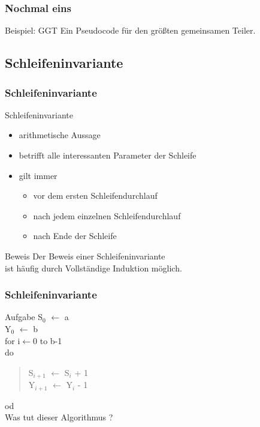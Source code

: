 \documentclass{beamer}
\begin{document}
\begin{frame}
	\frametitle{Nochmal eins}
	\begin{block}{Beispiel: GGT}
		Ein Pseudocode für den größten gemeinsamen Teiler.
	\end{block}
\end{frame}

\subsection{Schleifeninvariante}
\begin{frame}
	\frametitle{Schleifeninvariante}
	\begin{block}{Schleifeninvariante}
		\begin{itemize}
			\item arithmetische Aussage
			\item betrifft alle interessanten Parameter der Schleife
			\item gilt immer
			\begin{itemize}
				\item vor dem ersten Schleifendurchlauf
				\item nach jedem einzelnen Schleifendurchlauf
				\item nach Ende der Schleife
			\end{itemize}
		\end{itemize}
	\end{block}
	\begin{block}{Beweis}
		Der Beweis einer Schleifeninvariante \\
		ist häufig durch Vollständige Induktion möglich.
	\end{block}
\end{frame}

\begin{frame}
	\frametitle{Schleifeninvariante}
	\begin{block}{Aufgabe}
		S$_0$ $\leftarrow$ a \\
		Y$_0$ $\leftarrow$ b \\
		for i$\leftarrow$0 to b-1 \\
		do \\
		\begin{quote}
			S$_{i+1}$ $\leftarrow$ S$_i$ + 1 \\
			Y$_{i+1}$ $\leftarrow$ Y$_i$ - 1
		\end{quote}
		od \\
		Was tut dieser Algorithmus ?
	\end{block}
\end{frame}
\end{document}
